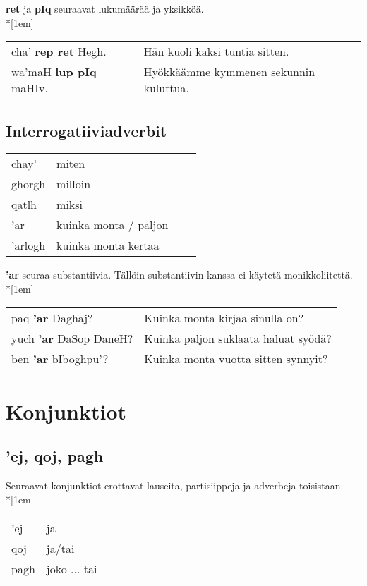 \documentclass{book}
\begin{document}
\textbf{ret} ja \textbf{pIq} seuraavat lukumäärää ja yksikköä.\\*[1em]
\begin{tabular}{l l}
    cha' \textbf{rep ret} Hegh. & Hän kuoli kaksi tuntia sitten. \\
    wa'maH \textbf{lup pIq} maHIv. & Hyökkäämme kymmenen sekunnin kuluttua. \\
\end{tabular}

\section{Interrogatiiviadverbit}

\begin{tabular}{Bl Il}
    chay' & miten \\
    ghorgh & milloin \\
    qatlh & miksi \\
    'ar & kuinka monta / paljon \\
    'arlogh & kuinka monta kertaa \\
\end{tabular}

\textbf{'ar} seuraa substantiivia. Tällöin substantiivin kanssa ei käytetä monikkoliitettä.\\*[1em]
\begin{tabular}{l l}
    paq \textbf{'ar} Daghaj? & Kuinka monta kirjaa sinulla on? \\
    yuch \textbf{'ar} DaSop DaneH? & Kuinka paljon suklaata haluat syödä? \\
    ben \textbf{'ar} bIboghpu'? & Kuinka monta vuotta sitten synnyit? \\
\end{tabular}

\chapter{Konjunktiot}

\section{'ej, qoj, pagh}

Seuraavat konjunktiot erottavat lauseita, partisiippeja ja adverbeja toisistaan.\\*[1em]
\begin{tabular}{Bl Il}
    'ej & ja \\
    qoj & ja/tai \\
    pagh & joko ... tai \\
\end{tabular}
\end{document}
